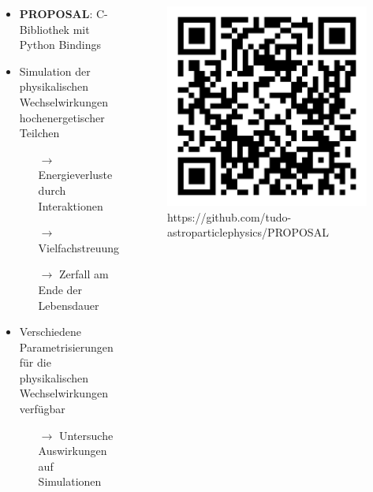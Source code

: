 \documentclass[aspectratio=1610, captions=tableheading, 11pt]{beamer}
\newcommand\CC{C\nolinebreak[4]\hspace{-.05em}\raisebox{.4ex}{\relsize{-3}{\textbf{++}}}\:}
\begin{document}
\begin{frame}
  \begin{columns}
    \begin{center}
      \begin{itemize}
        \setlength\itemsep{0.5em}
        \item \textbf{PROPOSAL}: \CC-Bibliothek mit Python Bindings
        \item Simulation der physikalischen Wechselwirkungen hochenergetischer Teilchen
        \begin{itemize}
          \item[$\rightarrow$] Energieverluste durch Interaktionen
          \item[$\rightarrow$] Vielfachstreuung
          \item[$\rightarrow$] Zerfall am Ende der Lebensdauer
        \end{itemize}
        \item Verschiedene Parametrisierungen für die physikalischen Wechselwirkungen verfügbar
        \begin{itemize}
          \item[$\rightarrow$] Untersuche Auswirkungen auf Simulationen
        \end{itemize}
      \end{itemize}
  \end{center}
      \begin{figure}
          \centering
          \includegraphics[width=0.8\linewidth]{plots/github.pdf}
           \captionsetup{format=myformat}
          \caption*{https://github.com/tudo-astroparticlephysics/PROPOSAL}
      \end{figure}
  \end{columns}

\end{frame}
\end{document}
